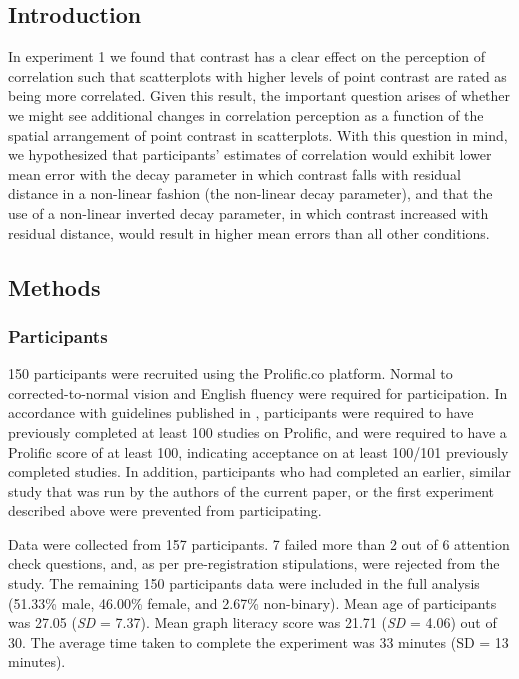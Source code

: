 \documentclass[preprint, 3p,
authoryear]{elsarticle} %
\begin{document}
\hypertarget{introduction-2}{%
\subsection{Introduction}\label{introduction-2}}

In experiment 1 we found that contrast has a clear effect on the
perception of correlation such that scatterplots with higher levels of
point contrast are rated as being more correlated. Given this result,
the important question arises of whether we might see additional changes
in correlation perception as a function of the spatial arrangement of
point contrast in scatterplots. With this question in mind, we
hypothesized that participants' estimates of correlation would exhibit
lower mean error with the decay parameter in which contrast falls with
residual distance in a non-linear fashion (the non-linear decay
parameter), and that the use of a non-linear inverted decay parameter,
in which contrast increased with residual distance, would result in
higher mean errors than all other conditions.

\hypertarget{methods}{%
\subsection{Methods}\label{methods}}

\hypertarget{participants-1}{%
\subsubsection{Participants}\label{participants-1}}

150 participants were recruited using the Prolific.co platform. Normal
to corrected-to-normal vision and English fluency were required for
participation. In accordance with guidelines published in
\citep{peer_2021}, participants were required to have previously
completed at least 100 studies on Prolific, and were required to have a
Prolific score of at least 100, indicating acceptance on at least
100/101 previously completed studies. In addition, participants who had
completed an earlier, similar study that was run by the authors of the
current paper, or the first experiment described above were prevented
from participating.

Data were collected from 157 participants. 7 failed more than 2 out of 6
attention check questions, and, as per pre-registration stipulations,
were rejected from the study. The remaining 150 participants data were
included in the full analysis (51.33\% male, 46.00\% female, and 2.67\%
non-binary). Mean age of participants was 27.05 (\emph{SD} = 7.37). Mean
graph literacy score was 21.71 (\emph{SD} = 4.06) out of 30. The average
time taken to complete the experiment was 33 minutes (SD = 13 minutes).
\end{document}
